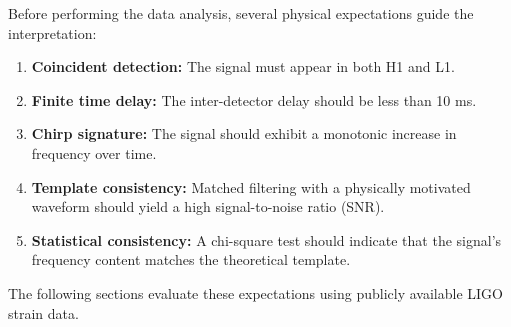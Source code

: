 Before performing the data analysis, several physical expectations guide the interpretation:

\begin{enumerate}
	\item \textbf{Coincident detection:} The signal must appear in both H1 and L1.
	\item \textbf{Finite time delay:} The inter-detector delay should be less than 10 ms.
	\item \textbf{Chirp signature:} The signal should exhibit a monotonic increase in frequency over time.
	\item \textbf{Template consistency:} Matched filtering with a physically motivated waveform should yield a high signal-to-noise ratio (SNR).
	\item \textbf{Statistical consistency:} A chi-square test should indicate that the signal’s frequency content matches the theoretical template.
\end{enumerate}

The following sections evaluate these expectations using publicly available LIGO strain data.
